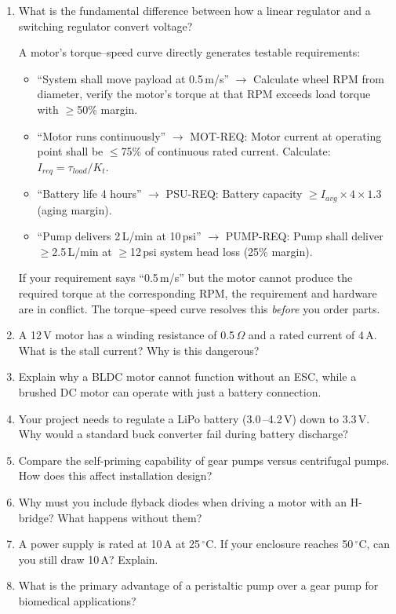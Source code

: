 \documentclass[11pt,letterpaper,twoside,openany]{book}
\begin{document}
\begin{enumerate}[leftmargin=1.5em]
  \item What is the fundamental difference between how a linear regulator and a switching regulator convert voltage?

\begin{keyconceptbox}
A motor's torque--speed curve directly generates testable requirements:
\begin{itemize}[nosep,leftmargin=1.5em]
\item ``System shall move payload at 0.5\,m/s'' $\to$ Calculate wheel RPM from diameter, verify the motor's torque at that RPM exceeds load torque with $\geq$50\% margin.
\item ``Motor runs continuously'' $\to$ MOT-REQ: Motor current at operating point shall be $\leq$75\% of continuous rated current. Calculate: $I_{req} = \tau_{load} / K_t$.
\item ``Battery life 4 hours'' $\to$ PSU-REQ: Battery capacity $\geq I_{avg} \times 4 \times 1.3$ (aging margin).
\item ``Pump delivers 2\,L/min at 10\,psi'' $\to$ PUMP-REQ: Pump shall deliver $\geq$2.5\,L/min at $\geq$12\,psi system head loss (25\% margin).
\end{itemize}
If your requirement says ``0.5\,m/s'' but the motor cannot produce the required torque at the corresponding RPM, the requirement and hardware are in conflict. The torque--speed curve resolves this \emph{before} you order parts.
\end{keyconceptbox}

  \item A 12\,V motor has a winding resistance of 0.5\,$\Omega$ and a rated current of 4\,A. What is the stall current? Why is this dangerous?

  \item Explain why a BLDC motor cannot function without an ESC, while a brushed DC motor can operate with just a battery connection.

  \item Your project needs to regulate a LiPo battery (3.0\,--4.2\,V) down to 3.3\,V. Why would a standard buck converter fail during battery discharge?

  \item Compare the self-priming capability of gear pumps versus centrifugal pumps. How does this affect installation design?

  \item Why must you include flyback diodes when driving a motor with an H-bridge? What happens without them?

  \item A power supply is rated at 10\,A at 25\,$^{\circ}$C. If your enclosure reaches 50\,$^{\circ}$C, can you still draw 10\,A? Explain.

  \item What is the primary advantage of a peristaltic pump over a gear pump for biomedical applications?
\end{enumerate}
\end{document}

